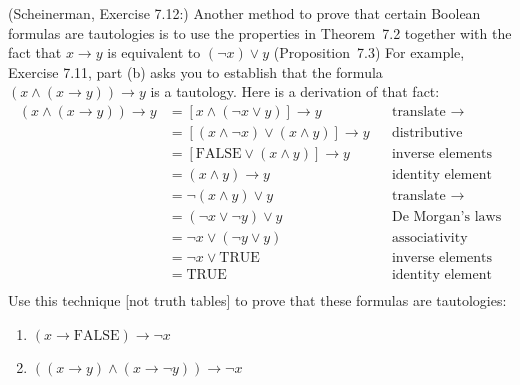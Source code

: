 \documentclass{article}
\theoremstyle{definition}
\begin{document}
\begin{question}
   (Scheinerman, Exercise 7.12:)
    Another method to prove that certain Boolean formulas
    are tautologies is to use the properties in Theorem~7.2
    together with the fact that $x \rightarrow y$ is equivalent
    to $(\neg x) \vee y$ (Proposition~7.3)
    For example, Exercise 7.11, part (b) asks you to establish that the formula $(x \wedge (x \rightarrow y)) \rightarrow y$ is 
    a tautology.  Here is a derivation of that fact:
    \begin{align*}
        (x \wedge (x \rightarrow y)) \rightarrow y
        &= [x \wedge (\neg x \vee y)] \rightarrow y
        && \text{translate $\rightarrow$} 
        \\
        &= [(x \wedge \neg x) \vee (x \wedge y)] \rightarrow y
        && \text{distributive}
        \\
        &= [\mathrm{FALSE} \vee (x\wedge y)] \rightarrow y
        && \text{inverse elements}
        \\
        &= (x\wedge y) \rightarrow y
        && \text{identity element}
        \\
        &= \neg(x\wedge y) \vee y
        && \text{translate $\rightarrow$}
        \\
        &= (\neg x \vee \neg y) \vee y
        && \text{De~Morgan's laws}
        \\
        &= \neg x \vee (\neg y \vee y)
        && \text{associativity}
        \\
        &= \neg x \vee \mathrm{TRUE}
        && \text{inverse elements}
        \\
        &= \mathrm{TRUE}
        && \text{identity element}
        \\
    \end{align*}
    Use this technique [not truth tables] to prove that these formulas
    are tautologies:
    \begin{enumerate}
        \item $(x \rightarrow \mathrm{FALSE}) \rightarrow \neg x$
        \item $((x \rightarrow y) \wedge (x \rightarrow \neg y)) \rightarrow \neg x$
    \end{enumerate}
\end{question}
\begin{solution}
\end{solution}
\end{document}
